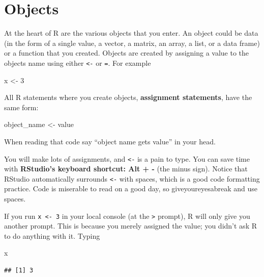 \documentclass[
]{book}
\newenvironment{Shaded}{\begin{snugshade}}{\end{snugshade}}
\newcommand{\DecValTok}[1]{\textcolor[rgb]{0.00,0.00,0.81}{#1}}
\newcommand{\NormalTok}[1]{#1}
\newcommand{\OtherTok}[1]{\textcolor[rgb]{0.56,0.35,0.01}{#1}}
\begin{document}
\hypertarget{objects}{%
\section{Objects}\label{objects}}

At the heart of R are the various objects that you enter. An object could be data (in the form of a single value, a vector, a matrix, an array, a list, or a data frame) or a function that you created. Objects are created by assigning a value to the objects name using either \texttt{\textless{}-} or \texttt{=}. For example

\begin{Shaded}
\begin{Highlighting}[]
\NormalTok{x }\OtherTok{\textless{}{-}} \DecValTok{3}
\end{Highlighting}
\end{Shaded}

All R statements where you create objects, \textbf{assignment statements}, have the same form:

\begin{Shaded}
\begin{Highlighting}[]
\NormalTok{object\_name }\OtherTok{\textless{}{-}}\NormalTok{ value}
\end{Highlighting}
\end{Shaded}

When reading that code say ``object name gets value'' in your head.

You will make lots of assignments, and \texttt{\textless{}-} is a pain to type. You can save time with \textbf{RStudio's keyboard shortcut: Alt + -} (the minus sign). Notice that RStudio automatically surrounds \texttt{\textless{}-} with spaces, which is a good code formatting practice. Code is miserable to read on a good day, so giveyoureyesabreak and use spaces.

If you run \texttt{x\ \textless{}-\ 3} in your local console (at the \texttt{\textgreater{}} prompt), R will only give you another prompt. This is because you merely assigned the value; you didn't ask R to do anything with it. Typing

\begin{Shaded}
\begin{Highlighting}[]
\NormalTok{x}
\end{Highlighting}
\end{Shaded}

\begin{verbatim}
## [1] 3
\end{verbatim}
\end{document}
